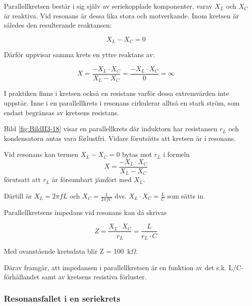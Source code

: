 Parallellkretsen består i sig själv av seriekopplade komponenter, varav
\(X_L\) och \(X_C\) är reaktiva.
Vid resonans är dessa lika stora och motverkande.
Inom kretsen är således den resulterande reaktansen:

\[X_L - X_C = 0\]

Därför uppvisar samma krets en yttre reaktans av:

\[
  X = \frac{-X_L \cdot X_C}{X_L - X_C}
  = \frac{-X_L \cdot X_C}{0}
  = \infty
\]

I praktiken finns i kretsen också en resistans varför dessa extremvärden inte
uppstår.
Inne i en parallellkrets i resonans cirkulerar alltså en stark ström,
som endast begränsas av kretsens resistans.

Bild \ref{fig:BildII3-18} visar en parallellkrets där induktorn har resistansen
\(r_L\) och kondensatorn antas vara förlustfri.
Vidare förutsätts att kretsen är i resonans.

Vid resonans kan termen \(X_L - X_C = 0\) bytas mot \(r_L\) i formeln
\[X = \frac{-X_L \cdot X_C}{X_L - X_C}\] förutsatt att \(r_L\) är försumbart
jämfört med \(X_L\).

Därtill är \(X_L = 2\pi fL\) och \(X_C = \frac{1}{2\pi fC}\) dvs.
\(X_L \cdot X_C = \frac{L}{C}\) som sätts in.

Parallellkretsens impedans vid resonans kan då skrivas

\[
Z = \frac{X_L \cdot X_C}{r_L} = \frac{L}{r_L \cdot C}
\]

Med ovanstående kretsdata blir Z = 100~k\(\Omega\).

Därav framgår, att impedansen i parallellkretsen är en funktion av det s.k.
L/C-förhållandet samt av kretsens resistiva förluster.

\subsubsection{Resonansfallet i en seriekrets}
\label{serieresonans}

